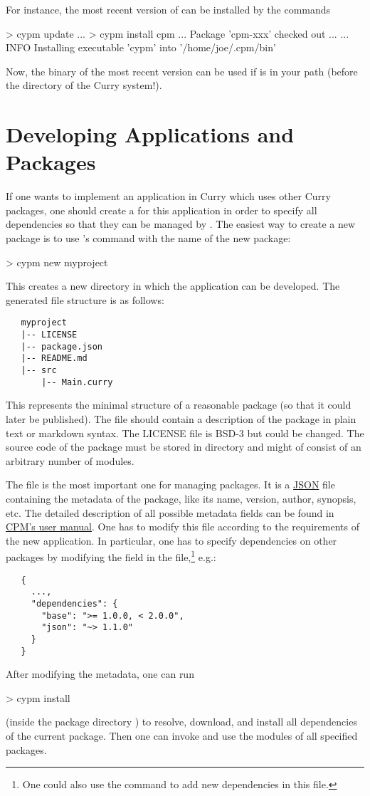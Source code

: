 For instance, the most recent version of \cpm
can be installed by the commands
%
\begin{curry}
> cypm update
...
> cypm install cpm
... Package 'cpm-xxx' checked out ...
...
INFO  Installing executable 'cypm' into '/home/joe/.cpm/bin'
\end{curry}
%
Now, the binary  of the most recent \cpm version can be used
if  is in your path
(before the  directory of the Curry system!).


\section{Developing Applications and Packages}
\label{sec:writing-packages}

If one wants to implement an application in Curry which uses
other Curry packages, one should create a  for
this application in order to specify all dependencies
so that they can be managed by \cpm.
The easiest way to create a new package is to use
\cpm's  command with the name of the new package:
%
\begin{curry}
> cypm new myproject
\end{curry}
%
This creates a new directory  in which
the application can be developed.
The generated file structure is as follows:
%
\begin{verbatim}
   myproject
   |-- LICENSE
   |-- package.json
   |-- README.md
   |-- src
       |-- Main.curry
\end{verbatim}
%
This represents the minimal structure of a reasonable package
(so that it could later be published).
The file  should contain a description
of the package in plain text or markdown syntax.
The LICENSE file is BSD-3 but could be changed.
The source code of the package must be stored
in directory  and might of consist of an arbitrary
number of modules.

The file  is the most important one
for managing packages. It is a \href{http://json.org}{JSON} file
containing the metadata of the package,
like its name, version, author, synopsis, etc.
The detailed description of all possible metadata fields
can be found in
\href{http://curry-language.org/tools/cpm}{CPM's user manual}.
One has to modify this file according to the requirements
of the new application.
In particular, one has to specify dependencies on other packages
by modifying the field  in the
 file,\footnote{One could also use the command
 to add new dependencies in this file.}
e.g.:
%
\begin{verbatim}
   {
     ...,
     "dependencies": {
       "base": ">= 1.0.0, < 2.0.0",
       "json": "~> 1.1.0"
     }
   }
\end{verbatim}
%
After modifying the metadata, one can run
%
\begin{curry}
> cypm install
\end{curry}
%
(inside the package directory )
to resolve, download, and install all dependencies of the current package.
Then one can invoke \pakcs and use the modules of all specified
packages.

